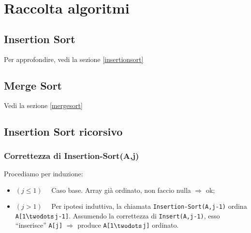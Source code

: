 \section{Raccolta algoritmi}

\subsection{Insertion Sort}
Per approfondire, vedi la sezione \ref{insertionsort} 


\subsection{Merge Sort}
Vedi la sezione \ref{mergesort}



\subsection{Insertion Sort ricorsivo}




\subsubsection{Correttezza di Insertion-Sort(A,j)}
Procediamo per induzione:
\begin{itemize}
	\item[] $(j \leq 1) \quad$ Caso base. Array già ordinato, non faccio nulla $\Rightarrow$ ok;
	\item[] $(j > 1) \quad$ Per ipotesi induttiva, la chiamata \texttt{Insertion-Sort(A,j-1)}
	ordina \texttt{A[1$\twodots$j-1]}. Assumendo la correttezza di \texttt{Insert(A,j-1)}, esso
	``inserisce'' \texttt{A[j]} $\Rightarrow$ produce \texttt{A[1$\twodots$j]} ordinato.
\end{itemize}

